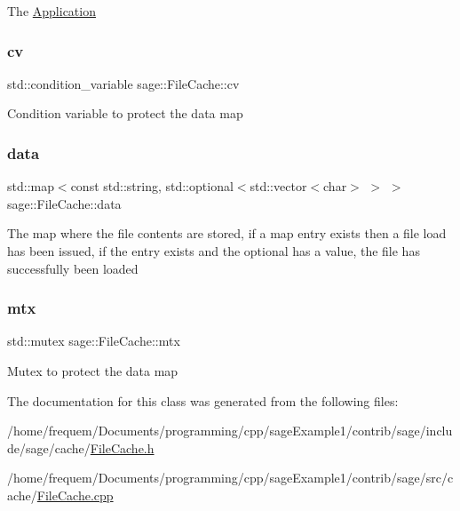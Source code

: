 The \mbox{\hyperlink{classsage_1_1Application}{Application}} \mbox{\label{classsage_1_1FileCache_ac6f227036472f8b5b5265d3126f992ae}} 
\subsubsection{\texorpdfstring{cv}{cv}}
{\footnotesize\ttfamily std\+::condition\+\_\+variable sage\+::\+File\+Cache\+::cv\hspace{0.3cm}{\ttfamily [private]}}

Condition variable to protect the data map \mbox{\label{classsage_1_1FileCache_ac3d22a89c9d2ab8aa2af4949002a8df4}} 
\subsubsection{\texorpdfstring{data}{data}}
{\footnotesize\ttfamily std\+::map$<$const std\+::string, std\+::optional$<$std\+::vector$<$char$>$ $>$ $>$ sage\+::\+File\+Cache\+::data\hspace{0.3cm}{\ttfamily [private]}}

The map where the file contents are stored, if a map entry exists then a file load has been issued, if the entry exists and the optional has a value, the file has successfully been loaded \mbox{\label{classsage_1_1FileCache_a1bbc9aebae036d04a6eef1f74d535d5a}} 
\subsubsection{\texorpdfstring{mtx}{mtx}}
{\footnotesize\ttfamily std\+::mutex sage\+::\+File\+Cache\+::mtx\hspace{0.3cm}{\ttfamily [private]}}

Mutex to protect the data map 

The documentation for this class was generated from the following files\+:\begin{DoxyCompactItemize}
\item 
/home/frequem/\+Documents/programming/cpp/sage\+Example1/contrib/sage/include/sage/cache/\mbox{\hyperlink{FileCache_8h}{File\+Cache.\+h}}\item 
/home/frequem/\+Documents/programming/cpp/sage\+Example1/contrib/sage/src/cache/\mbox{\hyperlink{FileCache_8cpp}{File\+Cache.\+cpp}}\end{DoxyCompactItemize}
